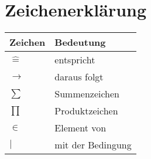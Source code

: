 \documentclass{formulaCollection}
\begin{document}
\section{Zeichenerklärung}

\begin{tabular}[h]{l|l}
Zeichen &Bedeutung  \\
\hline
$\widehat{=}$ & entspricht  \\
$\longrightarrow$ & daraus folgt \\
$\sum$ & Summenzeichen \\
$\prod$ & Produktzeichen \\
$ \in$ & Element von \\
$ |$ & mit der Bedingung \\
\end{tabular}
\end{document}
